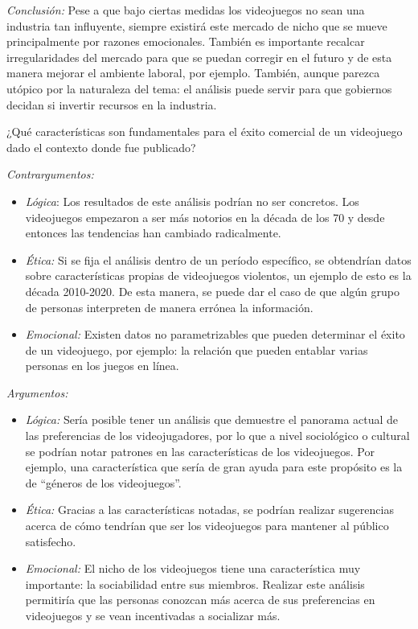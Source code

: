 \documentclass[
  letterpaper,
  DIV=11,
  numbers=noendperiod]{scrreprt}
\begin{document}
\emph{Conclusión:} Pese a que bajo ciertas medidas los videojuegos no
sean una industria tan influyente, siempre existirá este mercado de
nicho que se mueve principalmente por razones emocionales. También es
importante recalcar irregularidades del mercado para que se puedan
corregir en el futuro y de esta manera mejorar el ambiente laboral, por
ejemplo. También, aunque parezca utópico por la naturaleza del tema: el
análisis puede servir para que gobiernos decidan si invertir recursos en
la industria.

¿Qué características son fundamentales para el éxito comercial de un
videojuego dado el contexto donde fue publicado?

\emph{Contrargumentos:}

\begin{itemize}
\item
  \emph{Lógica}: Los resultados de este análisis podrían no ser
  concretos. Los videojuegos empezaron a ser más notorios en la década
  de los 70 y desde entonces las tendencias han cambiado radicalmente.
\item
  \emph{Ética:} Si se fija el análisis dentro de un período específico,
  se obtendrían datos sobre características propias de videojuegos
  violentos, un ejemplo de esto es la década 2010-2020. De esta manera,
  se puede dar el caso de que algún grupo de personas interpreten de
  manera errónea la información.
\item
  \emph{Emocional:} Existen datos no parametrizables que pueden
  determinar el éxito de un videojuego, por ejemplo: la relación que
  pueden entablar varias personas en los juegos en línea.
\end{itemize}

\emph{Argumentos:}

\begin{itemize}
\item
  \emph{Lógica:} Sería posible tener un análisis que demuestre el
  panorama actual de las preferencias de los videojugadores, por lo que
  a nivel sociológico o cultural se podrían notar patrones en las
  características de los videojuegos. Por ejemplo, una característica
  que sería de gran ayuda para este propósito es la de ``géneros de los
  videojuegos''.
\item
  \emph{Ética:} Gracias a las características notadas, se podrían
  realizar sugerencias acerca de cómo tendrían que ser los videojuegos
  para mantener al público satisfecho.
\item
  \emph{Emocional:} El nicho de los videojuegos tiene una característica
  muy importante: la sociabilidad entre sus miembros. Realizar este
  análisis permitiría que las personas conozcan más acerca de sus
  preferencias en videojuegos y se vean incentivadas a socializar más.
\end{itemize}
\end{document}
